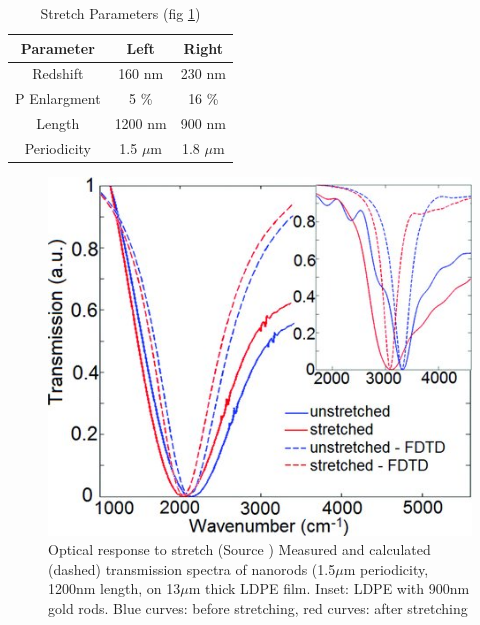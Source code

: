 \documentclass[journal, a4paper]{IEEEtran}
\begin{document}
	\begin{table}[!hbt]
		\begin{center}
		\caption{Stretch Parameters (fig \ref{fig:stretch-response})}
		\label{tab:simParameters}
		\begin{tabular}{|c|c|c|}
			\hline
			Parameter & Left & Right\\
			\hline
			Redshift & 160 nm & 230 nm\\
			\hline
			P Enlargment & 5 \% & 16 \%\\
			\hline
			Length & 1200 nm & 900 nm\\
			\hline
			Periodicity & 1.5 $\mu$m & 1.8 $\mu$m\\
			\hline
		\end{tabular}
		\end{center}
	\end{table}

\begin{figure}[hbt!]
\begin{center}
\includegraphics[width=\columnwidth]{14stretch-response.jpg}
\caption{Optical response to stretch (Source \cite{paper}) Measured and calculated (dashed) transmission spectra of nanorods (1.5$\mu$m periodicity, 1200nm length, on 13$\mu$m thick LDPE film. Inset: LDPE with 900nm gold rods. Blue curves: before stretching, red curves: after stretching}
\label{fig:stretch-response}
\end{center}
\end{figure} 
\end{document}
